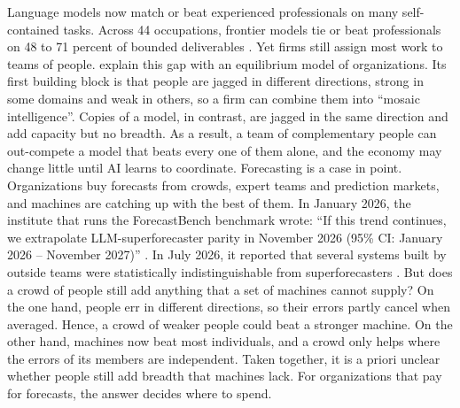 \documentclass[11pt,a4paper]{article}
\theoremstyle{definition}
\begin{document}
Language models now match or beat experienced professionals on many self-contained tasks. Across 44 occupations, frontier models tie or beat professionals on 48 to 71 percent of bounded deliverables \citep[as summarized by \citealp{imas2026organizing}]{patwardhan2025gdpval}. Yet firms still assign most work to teams of people. \citet{imas2026organizing} explain this gap with an equilibrium model of organizations. Its first building block is that people are jagged in different directions, strong in some domains and weak in others, so a firm can combine them into ``mosaic intelligence''. Copies of a model, in contrast, are jagged in the same direction and add capacity but no breadth. As a result, a team of complementary people can out-compete a model that beats every one of them alone, and the economy may change little until AI learns to coordinate. Forecasting is a case in point. Organizations buy forecasts from crowds, expert teams and prediction markets, and machines are catching up with the best of them. In January 2026, the institute that runs the ForecastBench benchmark wrote: ``If this trend continues, we extrapolate LLM-superforecaster parity in November 2026 (95\% CI: January 2026 -- November 2027)'' \citep{bastani2026closing}. In July 2026, it reported that several systems built by outside teams were statistically indistinguishable from superforecasters \citep{fri2026parity}. But does a crowd of people still add anything that a set of machines cannot supply? On the one hand, people err in different directions, so their errors partly cancel when averaged. Hence, a crowd of weaker people could beat a stronger machine. On the other hand, machines now beat most individuals, and a crowd only helps where the errors of its members are independent. Taken together, it is a priori unclear whether people still add breadth that machines lack. For organizations that pay for forecasts, the answer decides where to spend.
\end{document}
